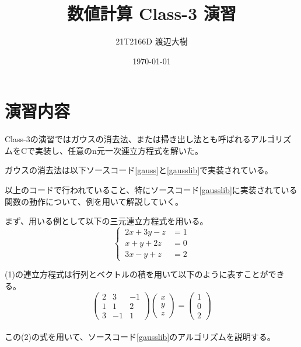 \documentclass[a4paper,11pt]{jsarticle}
\begin{document}
\title{数値計算 Class-3 演習}
\author{21T2166D 渡辺大樹}
\date{\today}
\maketitle
\section{演習内容}
Class-3の演習ではガウスの消去法、または掃き出し法とも呼ばれるアルゴリズムをCで実装し、任意のn元一次連立方程式を解いた。

ガウスの消去法は以下ソースコード\ref{gauss}と\ref{gausslib}で実装されている。

\newpage


以上のコードで行われていること、特にソースコード\ref{gausslib}に実装されている関数の動作について、例を用いて解説していく。

まず、用いる例として以下の三元連立方程式を用いる。
\begin{equation}
    \left \{ \,
    \begin{aligned}
        2x + 3y - z &= 1 \\
        x + y + 2z &= 0 \\
        3x - y + z &= 2
    \end{aligned}
    \right .
\end{equation}

(1)の連立方程式は行列とベクトルの積を用いて以下のように表すことができる。
\\
\begin{equation}
    \begin{pmatrix}
        2 & 3 & -1 \\
        1 & 1 & 2 \\
        3 & -1 & 1
    \end{pmatrix}
    \begin{pmatrix}
        x \\ y \\ z
    \end{pmatrix}
    =
    \begin{pmatrix}
        1 \\ 0 \\ 2
    \end{pmatrix}
\end{equation}
\\

この(2)の式を用いて、ソースコード\ref{gausslib}のアルゴリズムを説明する。
\end{document}
